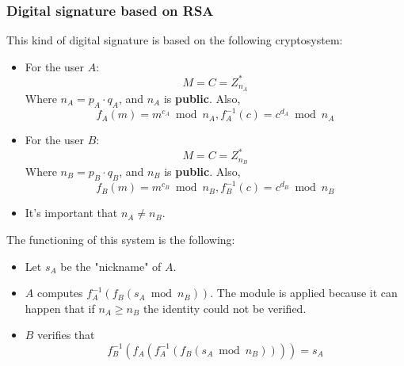 \subsubsection{Digital signature based on RSA}
This kind of digital signature is based on the following cryptosystem:
\begin{itemize}
    \item For the user $A$: \[M = C = Z_{n_{A}}^{*}\] Where $n_{A} = p_{A} \cdot q_{A}$, and $n_{A}$ is \textbf{public}. Also,
    \[f_{A}(m) = m^{c_{A}} \bmod n_{A}, f_{A}^{-1}(c) = c^{d_{A}} \bmod n_{A}\]
    \item For the user $B$: \[M = C = Z_{n_{B}}^{*}\] Where $n_{B} = p_{B} \cdot q_{B}$, and $n_{B}$ is \textbf{public}. Also,
    \[f_{B}(m) = m^{c_{B}} \bmod n_{B}, f_{B}^{-1}(c) = c^{d_{B}} \bmod n_{B}\]
    \item It's important that $n_{A} \neq n_{B}$.
\end{itemize}
The functioning of this system is the following:
\begin{itemize}
    \item Let $s_{A}$ be the "nickname" of $A$.
    \item $A$ computes $f_{A}^{-1}(f_{B}(s_{A} \bmod n_{B}))$. The module is applied because it can happen that if $n_{A} \geq n_{B}$ the identity could not be verified.
    \item $B$ verifies that
    \[
    f_{B}^{-1}(f_{A}(f_{A}^{-1}(f_{B}(s_{A} \bmod n_{B})))) = s_{A}
    \]
\end{itemize}
